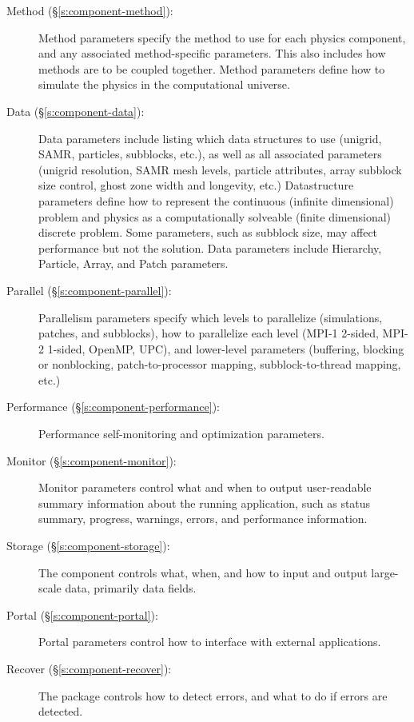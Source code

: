 \begin{description}
 \item [Method (\S\ref{s:component-method}): ] Method parameters specify the
 method to use for each physics component, and any associated
 method-specific parameters.  This also includes how methods are to be
 coupled together.  Method parameters define how to simulate the
 physics in the computational universe.

 \item [Data (\S\ref{s:component-data}): ] Data parameters include listing which
 data structures to use (unigrid, SAMR, particles, subblocks, etc.),
 as well as all associated parameters (unigrid resolution, SAMR mesh
 levels, particle attributes, array subblock size control, ghost zone
 width and longevity, etc.)  Datastructure parameters define how to
 represent the continuous (infinite dimensional) problem and physics
 as a computationally solveable (finite dimensional) discrete problem.
 Some parameters, such as subblock size, may affect performance but
 not the solution.  Data parameters include Hierarchy, Particle,
 Array, and Patch parameters.

 \item [Parallel (\S\ref{s:component-parallel}): ] Parallelism parameters
 specify which levels to parallelize (simulations, patches, and
 subblocks), how to parallelize each level (MPI-1 2-sided, MPI-2
 1-sided, OpenMP, UPC), and lower-level parameters (buffering,
 blocking or nonblocking, patch-to-processor mapping,
 subblock-to-thread mapping, etc.)

 \item [Performance (\S\ref{s:component-performance}): ] Performance
 self-monitoring and optimization parameters.

 \item [Monitor (\S\ref{s:component-monitor}): ] Monitor parameters control what
 and when to output user-readable summary information about the
 running application, such as status summary, progress, warnings,
 errors, and performance information.

 \item [Storage (\S\ref{s:component-storage}): ] The 
 component controls what, when, and how to input and output
 large-scale data, primarily data fields.

 \item [Portal (\S\ref{s:component-portal}): ] Portal parameters control
  how to interface with external applications.

 \item [Recover (\S\ref{s:component-recover}): ] The 
 package controls how to detect errors, and what to do if errors are
 detected.

\end{description}

